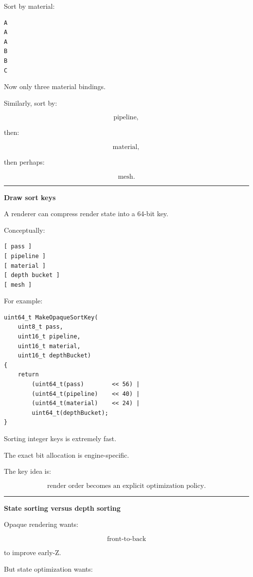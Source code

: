 Sort by material:

\begin{verbatim}
A
A
A
B
B
C
\end{verbatim}

Now only three material bindings.

Similarly, sort by:

\[
\text{pipeline},
\]

then:

\[
\text{material},
\]

then perhaps:

\[
\text{mesh}.
\]

\begin{center}\rule{0.5\linewidth}{0.5pt}\end{center}

\textbf{Draw sort keys}

A renderer can compress render state into a 64-bit key.

Conceptually:

\begin{verbatim}
[ pass ]
[ pipeline ]
[ material ]
[ depth bucket ]
[ mesh ]
\end{verbatim}

For example:

\begin{verbatim}
uint64_t MakeOpaqueSortKey(
    uint8_t pass,
    uint16_t pipeline,
    uint16_t material,
    uint16_t depthBucket)
{
    return
        (uint64_t(pass)        << 56) |
        (uint64_t(pipeline)    << 40) |
        (uint64_t(material)    << 24) |
        uint64_t(depthBucket);
}
\end{verbatim}

Sorting integer keys is extremely fast.

The exact bit allocation is engine-specific.

The key idea is:

\[
\boxed{
\text{render order becomes an explicit optimization policy}.
}
\]

\begin{center}\rule{0.5\linewidth}{0.5pt}\end{center}

\textbf{State sorting versus depth sorting}

Opaque rendering wants:

\[
\text{front-to-back}
\]

to improve early-Z.

But state optimization wants:

